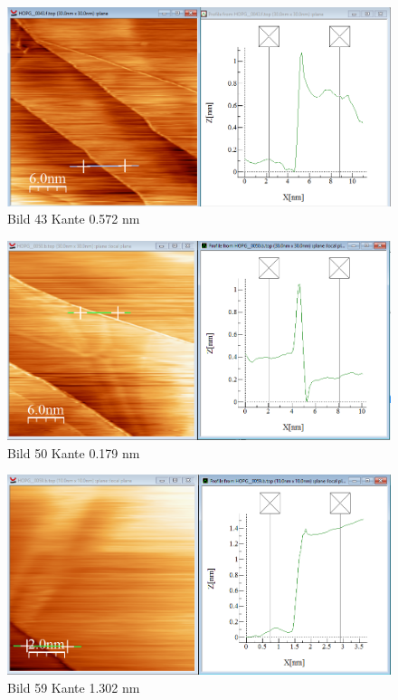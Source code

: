 \documentclass[10pt,a4paper]{article}
\begin{document}
\begin{figure}[]
	\includegraphics[scale = 0.2]{bild43.png}
	\centering
	\caption{Bild 43 Kante 0.572 nm}
	\label{b43}
\end{figure}

\begin{figure}[]
	\includegraphics[scale = 0.2]{bild50.png}
	\centering
	\caption{Bild 50 Kante 0.179 nm}
	\label{b50}
\end{figure}

\begin{figure}[]
	\includegraphics[scale = 0.2]{bild59.png}
	\centering
	\caption{Bild 59 Kante 1.302 nm}
	\label{b59}
\end{figure}
\end{document}
